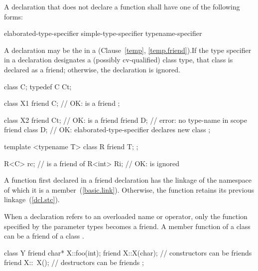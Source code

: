 \pnum
A  declaration that does not declare a function
shall have one of the following forms:

\begin{ncsimplebnf}
 elaborated-type-specifier \terminal{;}\br
{} simple-type-specifier \terminal{;}\br
{} typename-specifier \terminal{;}
\end{ncsimplebnf}

\enternote A  declaration may be the
 in a 
(Clause~\ref{temp}, \ref{temp.friend}).\exitnote If the
type specifier in a  declaration designates a (possibly
cv-qualified) class type, that class is declared as a friend; otherwise, the
 declaration is ignored. \enterexample

\begin{codeblock}
class C;
typedef C Ct;

class X1 {
  friend C;         // OK:  is a friend
};

class X2 {
  friend Ct;        // OK:  is a friend
  friend D;         // error: no type-name  in scope
  friend class D;   // OK: elaborated-type-specifier declares new class
};

template <typename T> class R {
  friend T;
};

R<C> rc;            //  is a friend of 
R<int> Ri;          // OK:  is ignored
\end{codeblock}
\exitexample

\pnum
{}%
A function first declared in a friend declaration
has the linkage of the namespace of which it is a member~(\ref{basic.link}).
Otherwise, the function retains its previous linkage~(\ref{dcl.stc}).

\pnum
{}%
When a
declaration refers to an overloaded name or operator, only the function specified
by the parameter types becomes a friend.
A member function of a class
can be a friend of
a class
.
%
\enterexample

\begin{codeblock}
class Y {
  friend char* X::foo(int);
  friend X::X(char);            // constructors can be friends
  friend X::~X();               // destructors can be friends
};
\end{codeblock}
\exitexample

